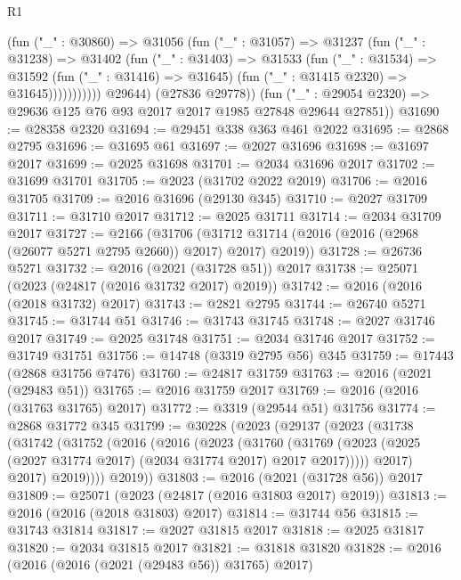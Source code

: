 \begin{lexlean}{R1}
\begin{coremodule}
                    (fun ("_" : @30860) =>
                    @31056
                      (fun ("_" : @31057) =>
                      @31237
                        (fun ("_" : @31238) =>
                        @31402
                          (fun ("_" : @31403) =>
                          @31533
                            (fun ("_" : @31534) =>
                            @31592
                              (fun ("_" : @31416) => @31645)
                              (fun ("_" : @31415 @2320) => @31645)))))))))))
          @29644)
        (@27836 @29778))
      (fun ("_" : @29054 @2320) => @29636 @125 @76 @93 @2017 @2017 @1985 @27848 @29644 @27851))
@31690 := @28358 @2320
@31694 := @29451 @338 @363 @461 @2022
@31695 := @2868 @2795
@31696 := @31695 @61
@31697 := @2027 @31696
@31698 := @31697 @2017
@31699 := @2025 @31698
@31701 := @2034 @31696 @2017
@31702 := @31699 @31701
@31705 := @2023 (@31702 @2022 @2019)
@31706 := @2016 @31705
@31709 := @2016 @31696 (@29130 @345)
@31710 := @2027 @31709
@31711 := @31710 @2017
@31712 := @2025 @31711
@31714 := @2034 @31709 @2017
@31727 := @2166
    (@31706 (@31712 @31714 (@2016 (@2016 (@2968 (@26077 @5271 @2795 @2660)) @2017) @2017) @2019))
@31728 := @26736 @5271
@31732 := @2016 (@2021 (@31728 @51)) @2017
@31738 := @25071 (@2023 (@24817 (@2016 @31732 @2017) @2019))
@31742 := @2016 (@2016 (@2018 @31732) @2017)
@31743 := @2821 @2795
@31744 := @26740 @5271
@31745 := @31744 @51
@31746 := @31743 @31745
@31748 := @2027 @31746 @2017
@31749 := @2025 @31748
@31751 := @2034 @31746 @2017
@31752 := @31749 @31751
@31756 := @14748 (@3319 @2795 @56) @345
@31759 := @17443 (@2868 @31756 @7476)
@31760 := @24817 @31759
@31763 := @2016 (@2021 (@29483 @51))
@31765 := @2016 @31759 @2017
@31769 := @2016 (@2016 (@31763 @31765) @2017)
@31772 := @3319 (@29544 @51) @31756
@31774 := @2868 @31772 @345
@31799 := @30228
    (@2023
      (@29137
        (@2023
          (@31738
            (@31742
              (@31752
                (@2016
                  (@2016
                    (@2023
                      (@31760
                        (@31769
                          (@2023 (@2025 (@2027 @31774 @2017) (@2034 @31774 @2017) @2017 @2017)))))
                    @2017)
                  @2017)
                @2019))))
        @2019))
@31803 := @2016 (@2021 (@31728 @56)) @2017
@31809 := @25071 (@2023 (@24817 (@2016 @31803 @2017) @2019))
@31813 := @2016 (@2016 (@2018 @31803) @2017)
@31814 := @31744 @56
@31815 := @31743 @31814
@31817 := @2027 @31815 @2017
@31818 := @2025 @31817
@31820 := @2034 @31815 @2017
@31821 := @31818 @31820
@31828 := @2016 (@2016 (@2016 (@2021 (@29483 @56)) @31765) @2017)

\end{coremodule}
\end{lexlean}
